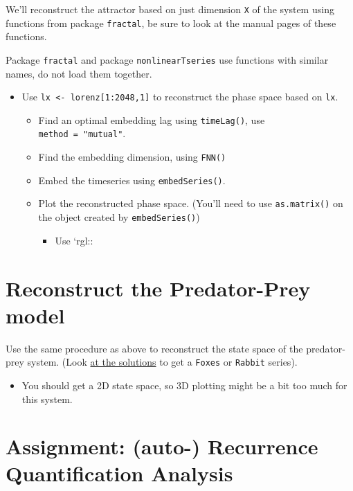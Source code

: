 \documentclass[]{book}
\providecommand{\tightlist}{%
  \setlength{\itemsep}{0pt}\setlength{\parskip}{0pt}}
\let\stdsection\section
\renewcommand\section{\newpage\stdsection}
\let\BeginKnitrBlock\begin \let\EndKnitrBlock\end
\begin{document}
We'll reconstruct the attractor based on just dimension \texttt{X} of
the system using functions from package \texttt{fractal}, be sure to
look at the manual pages of these functions.

\BeginKnitrBlock{rmdimportant}
Package \texttt{fractal} and package \texttt{nonlinearTseries} use
functions with similar names, do not load them together.
\EndKnitrBlock{rmdimportant}

\begin{itemize}
\tightlist
\item
  Use \texttt{lx\ \textless{}-\ lorenz{[}1:2048,1{]}} to reconstruct the
  phase space based on \texttt{lx}.

  \begin{itemize}
  \tightlist
  \item
    Find an optimal embedding lag using \texttt{timeLag()}, use
    \texttt{method\ =\ "mutual"}.
  \item
    Find the embedding dimension, using \texttt{FNN()}
  \item
    Embed the timeseries using \texttt{embedSeries()}.
  \item
    Plot the reconstructed phase space. (You'll need to use
    \texttt{as.matrix()} on the object created by
    \texttt{embedSeries()})

    \begin{itemize}
    \tightlist
    \item
      Use `rgl::
    \end{itemize}
  \end{itemize}
\end{itemize}

\section{Reconstruct the Predator-Prey
model}\label{reconstruct-the-predator-prey-model}

Use the same procedure as above to reconstruct the state space of the
predator-prey system. (Look \protect\hyperlink{ppdsol}{at the solutions}
to get a \texttt{Foxes} or \texttt{Rabbit} series).

\begin{itemize}
\tightlist
\item
  You should get a 2D state space, so 3D plotting might be a bit too
  much for this system.
\end{itemize}

\section{Assignment: (auto-) Recurrence Quantification
Analysis}\label{assignment-auto--recurrence-quantification-analysis}
\end{document}
